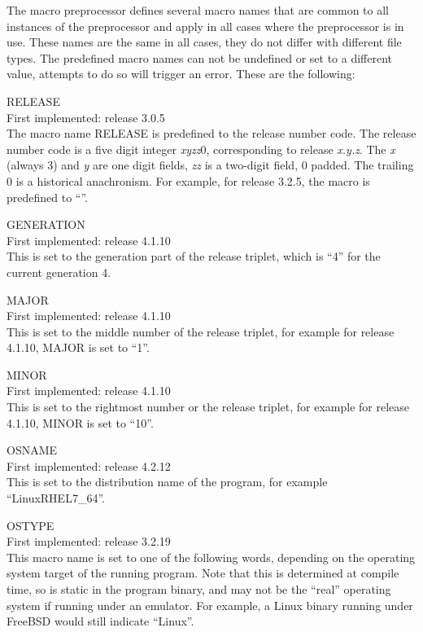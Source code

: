 The macro preprocessor defines several macro names that are common to
all instances of the preprocessor and apply in all cases where the
preprocessor is in use.  These names are the same in all cases, they
do not differ with different file types.  The predefined macro names
can not be undefined or set to a different value, attempts to do so
will trigger an error.  These are the following:

\begin{description}
\item{\vt RELEASE}\\
First implemented: release 3.0.5\\
The macro name {\vt RELEASE} is predefined to the release number code. 
The release number code is a five digit integer {\it xyzz\/}0,
corresponding to release {\it x.y.z}.  The {\it x} (always 3) and {\it
y} are one digit fields, {\it zz} is a two-digit field, 0 padded.  The
trailing 0 is a historical anachronism.  For example, for release
3.2.5, the macro is predefined to ``{}''.

\item{\vt GENERATION}\\
First implemented: release 4.1.10\\
This is set to the generation part of the release triplet, which is
``4'' for the current generation 4.

\item{\vt MAJOR}\\
First implemented: release 4.1.10\\
This is set to the middle number of the release triplet, for 
example for release 4.1.10, {\vt MAJOR} is set to ``1''.

\item{\vt MINOR}\\
First implemented: release 4.1.10\\
This is set to the rightmost number or the release triplet, for
example for release 4.1.10, {\vt MINOR} is set to ``10''.

\item{\vt OSNAME}\\
First implemented: release 4.2.12\\
This is set to the distribution name of the program, for example
``{\vt LinuxRHEL7\_64}''.

\item{\vt OSTYPE}\\
First implemented: release 3.2.19\\
This macro name is set to one of the following words, depending on the
operating system target of the running program.  Note that this is
determined at compile time, so is static in the program binary, and
may not be the ``real'' operating system if running under an emulator. 
For example, a Linux binary running under FreeBSD would still indicate
``{\vt Linux}''.


\end{description}
